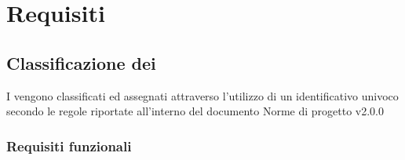 \clearpage
{}

\section{Requisiti}
\label{sec:requisiti}
\subsection{Classificazione dei }
\label{sec:classificazione_requisiti}
I  vengono classificati ed assegnati attraverso l'utilizzo di un identificativo univoco secondo le regole riportate all'interno del documento Norme di progetto v2.0.0
\subsubsection{Requisiti funzionali}
